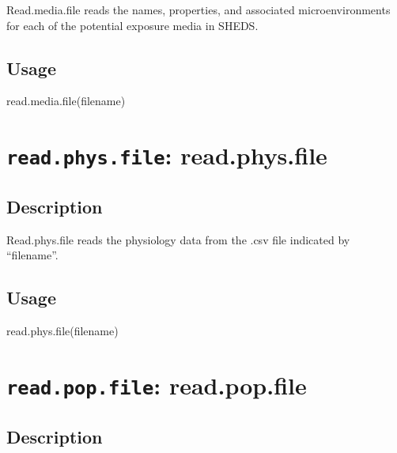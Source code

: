 \documentclass[
]{article}
\newenvironment{Shaded}{\begin{snugshade}}{\end{snugshade}}
\newcommand{\FunctionTok}[1]{\textcolor[rgb]{0.00,0.00,0.00}{#1}}
\newcommand{\NormalTok}[1]{#1}
\begin{document}
Read.media.file reads the names, properties, and associated
microenvironments for each of the potential exposure media in SHEDS.

\hypertarget{usage-40}{%
\subsection{Usage}\label{usage-40}}

\begin{Shaded}
\begin{Highlighting}[]
\FunctionTok{read.media.file}\NormalTok{(filename)}
\end{Highlighting}
\end{Shaded}

\hypertarget{read.phys.file-read.phys.file}{%
\section{\texorpdfstring{\texttt{read.phys.file}:
read.phys.file}{read.phys.file: read.phys.file}}\label{read.phys.file-read.phys.file}}

\hypertarget{description-41}{%
\subsection{Description}\label{description-41}}

Read.phys.file reads the physiology data from the .csv file indicated by
``filename''.

\hypertarget{usage-41}{%
\subsection{Usage}\label{usage-41}}

\begin{Shaded}
\begin{Highlighting}[]
\FunctionTok{read.phys.file}\NormalTok{(filename)}
\end{Highlighting}
\end{Shaded}

\hypertarget{read.pop.file-read.pop.file}{%
\section{\texorpdfstring{\texttt{read.pop.file}:
read.pop.file}{read.pop.file: read.pop.file}}\label{read.pop.file-read.pop.file}}

\hypertarget{description-42}{%
\subsection{Description}\label{description-42}}
\end{document}
